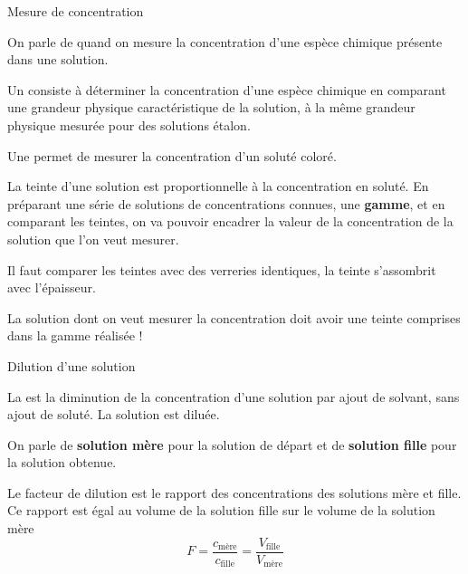 \begin{doc}{Mesure de concentration}
  \label{doc:dosage}
  \vspace*{-24pt}
  \begin{encart}
    On parle de  quand on mesure la concentration d'une espèce chimique présente dans une solution.
    
    Un  consiste à déterminer la concentration d’une espèce chimique en comparant une grandeur physique caractéristique de la solution, à la même grandeur physique mesurée pour des solutions étalon.
  \end{encart}
  
  \begin{encart}
    Une  permet de mesurer la concentration d'un soluté coloré.
    \vspace*{-16pt}
  \end{encart}

  La teinte d'une solution est proportionnelle à la concentration en soluté.
  En préparant une série de solutions de concentrations connues, une \textbf{gamme}, et en comparant les teintes, on va pouvoir encadrer la valeur de la concentration de la solution que l'on veut mesurer.
  
  \bigskip
  
  \attention Il faut comparer les teintes avec des verreries identiques, la teinte s'assombrit avec l'épaisseur.
  
  \attention La solution dont on veut mesurer la concentration doit avoir une teinte comprises dans la gamme réalisée !
\end{doc}
 

\begin{doc}{Dilution d'une solution}
  \label{doc:dilution}
  \vspace*{-24pt}
  \begin{encart}
    La  est la diminution de la concentration d'une solution par ajout de solvant, sans ajout de soluté.
    La solution est diluée.
  \end{encart}
  On parle de \textbf{solution mère} pour la solution de départ et de \textbf{solution fille} pour la solution obtenue.
  
  Le facteur de dilution est le rapport des concentrations des solutions mère et fille.
  Ce rapport est égal au volume de la solution fille sur le volume de la solution mère
  \begin{equation*}
    F = \frac{c_\text{mère}}{c_\text{fille}}
      = \frac{V_\text{fille}}{V_\text{mère}}
  \end{equation*}
\end{doc}



